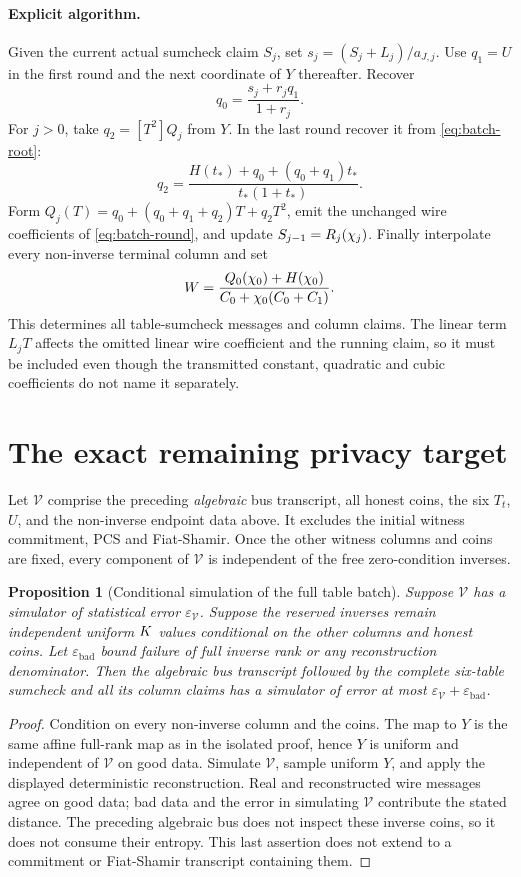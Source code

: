 \documentclass[11pt]{article}
\newtheorem{proposition}{Proposition}
\begin{document}
\paragraph{Explicit algorithm.} Given the current actual sumcheck claim $S_j$, set $s_j=(S_j+L_j)/a_{J,j}$. Use $q_1=U$ in the first round and the next coordinate of $Y$ thereafter. Recover
\[
 q_0=\frac{s_j+r_jq_1}{1+r_j}.
\]
For $j>0$, take $q_2=[T^2]Q_j$ from $Y$. In the last round recover it from \eqref{eq:batch-root}:
\[
 q_2=\frac{H(t_*)+q_0+(q_0+q_1)t_*}{t_*(1+t_*)}.
\]
Form $Q_j(T)=q_0+(q_0+q_1+q_2)T+q_2T^2$, emit the unchanged wire coefficients of \eqref{eq:batch-round}, and update $S_{j-1}=R_j(\chi_j)$. Finally interpolate every non-inverse terminal column and set
\[
 W=\frac{Q_0(\chi_0)+H(\chi_0)}{C_0+\chi_0(C_0+C_1)}.
\]
This determines all table-sumcheck messages and column claims. The linear term $L_jT$ affects the omitted linear wire coefficient and the running claim, so it must be included even though the transmitted constant, quadratic and cubic coefficients do not name it separately.

\section{The exact remaining privacy target}

Let $\mathcal V$ comprise the preceding \emph{algebraic} bus transcript, all honest coins, the six $T_t$, $U$, and the non-inverse endpoint data above. It excludes the initial witness commitment, PCS and Fiat-Shamir. Once the other witness columns and coins are fixed, every component of $\mathcal V$ is independent of the free zero-condition inverses.

\begin{proposition}[Conditional simulation of the full table batch]\label{prop:full-table-conditional}
Suppose $\mathcal V$ has a simulator of statistical error $\varepsilon_{\mathcal V}$. Suppose the reserved inverses remain independent uniform $K$ values conditional on the other columns and honest coins. Let $\varepsilon_{\mathrm{bad}}$ bound failure of full inverse rank or any reconstruction denominator. Then the algebraic bus transcript followed by the complete six-table sumcheck and all its column claims has a simulator of error at most $\varepsilon_{\mathcal V}+\varepsilon_{\mathrm{bad}}$.
\end{proposition}
\begin{proof}
Condition on every non-inverse column and the coins. The map to $Y$ is the same affine full-rank map as in the isolated proof, hence $Y$ is uniform and independent of $\mathcal V$ on good data. Simulate $\mathcal V$, sample uniform $Y$, and apply the displayed deterministic reconstruction. Real and reconstructed wire messages agree on good data; bad data and the error in simulating $\mathcal V$ contribute the stated distance. The preceding algebraic bus does not inspect these inverse coins, so it does not consume their entropy. This last assertion does not extend to a commitment or Fiat-Shamir transcript containing them.
\end{proof}
\end{document}
